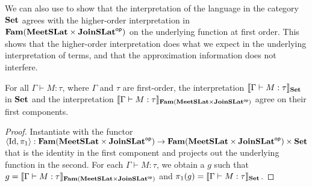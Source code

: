 We can also use  to show that the
interpretation of the language in the category $\mathbf{Set}$ agrees with the
higher-order interpretation in $\mathbf{Fam}(\mathbf{MeetSLat} \times \mathbf{JoinSLat}^{\mathsf{op}})$
on the underlying function at first order. This shows that the
higher-order interpretation does what we expect in the underlying
interpretation of terms, and that the approximation information does
not interfere.

\begin{theorem}
  \label{thm:underlying-interp-equal} For all
  $\Gamma \vdash M : \tau$, where $\Gamma$ and $\tau$ are first-order,
  the interpretation $\llbracket \Gamma \vdash M : \tau \rrbracket_{\mathbf{Set}}$ in $\mathbf{Set}$
  and the interpretation
  $\llbracket \Gamma \vdash M : \tau \rrbracket_{\mathbf{Fam}(\mathbf{MeetSLat} \times
    \mathbf{JoinSLat}^{\mathsf{op}})}$ agree on their first components.
\end{theorem}

\begin{proof}
  Instantiate  with the functor
  $\langle \mathrm{Id} , \pi_1 \rangle : \mathbf{Fam}(\mathbf{MeetSLat} \times
  \mathbf{JoinSLat}^{\mathsf{op}}) \to \mathbf{Fam}(\mathbf{MeetSLat} \times \mathbf{JoinSLat}^{\mathsf{op}}) \times \mathbf{Set}$
  that is the identity in the first component and projects out the
  underlying function in the second. For each
  $\Gamma \vdash M : \tau$, we obtain a $g$ such that
  $g = \llbracket \Gamma \vdash M : \tau \rrbracket_{\mathbf{Fam}(\mathbf{MeetSLat} \times
    \mathbf{JoinSLat}^{\mathsf{op}})}$ and
  $\pi_1(g) = \llbracket \Gamma \vdash M : \tau \rrbracket_{\mathbf{Set}}$. %
\end{proof}
